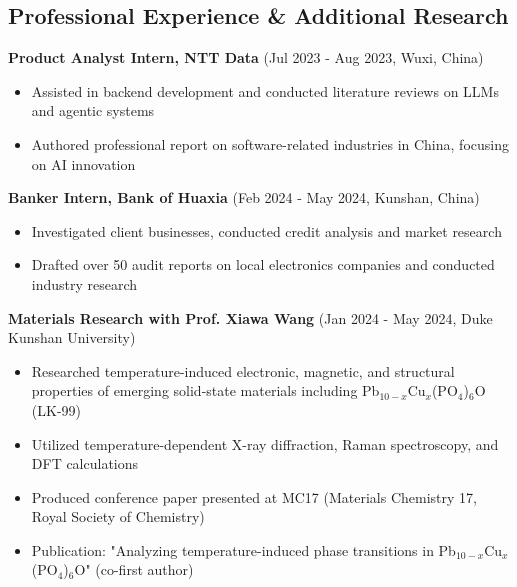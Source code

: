 
\subsection*{Professional Experience \& Additional Research}

\textbf{Product Analyst Intern, NTT Data} (Jul 2023 - Aug 2023, Wuxi, China)
\begin{itemize}[leftmargin=1.2em, itemsep=0.1em]
  \item Assisted in backend development and conducted literature reviews on LLMs and agentic systems
  \item Authored professional report on software-related industries in China, focusing on AI innovation
\end{itemize}

\vspace{0.5em}

\textbf{Banker Intern, Bank of Huaxia} (Feb 2024 - May 2024, Kunshan, China)
\begin{itemize}[leftmargin=1.2em, itemsep=0.1em]
  \item Investigated client businesses, conducted credit analysis and market research
  \item Drafted over 50 audit reports on local electronics companies and conducted industry research
\end{itemize}

\vspace{0.5em}

\textbf{Materials Research with Prof. Xiawa Wang} (Jan 2024 - May 2024, Duke Kunshan University)
\begin{itemize}[leftmargin=1.2em, itemsep=0.1em]
  \item Researched temperature-induced electronic, magnetic, and structural properties of emerging solid-state materials including Pb$_{10-x}$Cu$_x$(PO$_4$)$_6$O (LK-99)
  \item Utilized temperature-dependent X-ray diffraction, Raman spectroscopy, and DFT calculations
  \item Produced conference paper presented at MC17 (Materials Chemistry 17, Royal Society of Chemistry)
  \item Publication: "Analyzing temperature-induced phase transitions in Pb$_{10-x}$Cu$_x$(PO$_4$)$_6$O" (co-first author)
\end{itemize}


